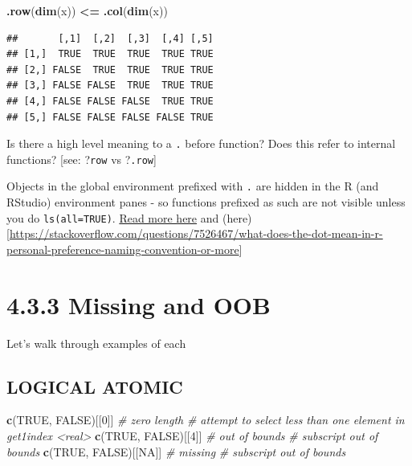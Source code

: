\documentclass[]{book}
\newenvironment{Shaded}{\begin{snugshade}}{\end{snugshade}}
\newcommand{\CommentTok}[1]{\textcolor[rgb]{0.56,0.35,0.01}{\textit{#1}}}
\newcommand{\DecValTok}[1]{\textcolor[rgb]{0.00,0.00,0.81}{#1}}
\newcommand{\KeywordTok}[1]{\textcolor[rgb]{0.13,0.29,0.53}{\textbf{#1}}}
\newcommand{\NormalTok}[1]{#1}
\newcommand{\OperatorTok}[1]{\textcolor[rgb]{0.81,0.36,0.00}{\textbf{#1}}}
\newcommand{\OtherTok}[1]{\textcolor[rgb]{0.56,0.35,0.01}{#1}}
\newcommand{\StringTok}[1]{\textcolor[rgb]{0.31,0.60,0.02}{#1}}
\begin{document}
\begin{Shaded}
\begin{Highlighting}[]
\KeywordTok{.row}\NormalTok{(}\KeywordTok{dim}\NormalTok{(x)) }\OperatorTok{<=}\StringTok{ }\KeywordTok{.col}\NormalTok{(}\KeywordTok{dim}\NormalTok{(x))}
\end{Highlighting}
\end{Shaded}

\begin{verbatim}
##       [,1]  [,2]  [,3]  [,4] [,5]
## [1,]  TRUE  TRUE  TRUE  TRUE TRUE
## [2,] FALSE  TRUE  TRUE  TRUE TRUE
## [3,] FALSE FALSE  TRUE  TRUE TRUE
## [4,] FALSE FALSE FALSE  TRUE TRUE
## [5,] FALSE FALSE FALSE FALSE TRUE
\end{verbatim}

Is there a high level meaning to a \texttt{.} before function? Does this refer to internal functions? {[}see: ?\texttt{row} vs ?\texttt{.row}{]}

Objects in the global environment prefixed with \texttt{.} are hidden in the R (and RStudio) environment panes - so functions prefixed as such are not visible unless you do \texttt{ls(all=TRUE)}. \href{https://community.rstudio.com/t/function-argument-naming-conventions-x-vs-x/7764}{Read more here} and (here){[}\url{https://stackoverflow.com/questions/7526467/what-does-the-dot-mean-in-r-personal-preference-naming-convention-or-more}{]}

\hypertarget{missing-and-oob}{%
\section*{4.3.3 Missing and OOB}\label{missing-and-oob}}

Let's walk through examples of each

\hypertarget{logical-atomic}{%
\subsection*{LOGICAL ATOMIC}\label{logical-atomic}}

\begin{Shaded}
\begin{Highlighting}[]
\KeywordTok{c}\NormalTok{(}\OtherTok{TRUE}\NormalTok{, }\OtherTok{FALSE}\NormalTok{)[[}\DecValTok{0}\NormalTok{]] }\CommentTok{# zero length}
\CommentTok{# attempt to select less than one element in get1index <real>}
\KeywordTok{c}\NormalTok{(}\OtherTok{TRUE}\NormalTok{, }\OtherTok{FALSE}\NormalTok{)[[}\DecValTok{4}\NormalTok{]] }\CommentTok{# out of bounds}
\CommentTok{# subscript out of bounds}
\KeywordTok{c}\NormalTok{(}\OtherTok{TRUE}\NormalTok{, }\OtherTok{FALSE}\NormalTok{)[[}\OtherTok{NA}\NormalTok{]] }\CommentTok{# missing}
\CommentTok{# subscript out of bounds}
\end{Highlighting}
\end{Shaded}
\end{document}
